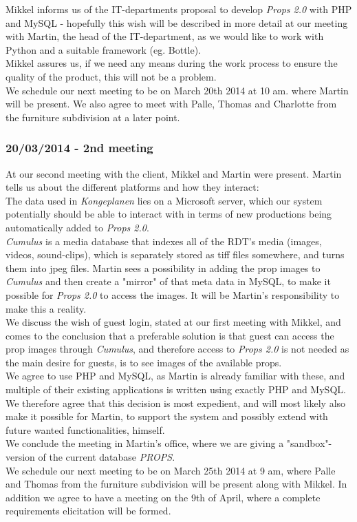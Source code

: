 \documentclass[12pt]{article}
\begin{document}
Mikkel informs us of the IT-departments proposal to develop \textit{Props 2.0} with PHP and MySQL - hopefully this wish will be described in more detail at our meeting with Martin, the head of the IT-department, as we would like to work with Python and a suitable framework (eg. Bottle). \\
Mikkel assures us, if we need any means during the work process to ensure the quality of the product, this will not be a problem.\\
We schedule our next meeting to be on March 20th 2014 at 10 am. where Martin will be present. We also agree to meet with Palle, Thomas and Charlotte from the furniture subdivision at a later point.
\subsubsection{20/03/2014 - 2nd meeting}
At our second meeting with the client, Mikkel and Martin were present. Martin tells us about the different platforms and how they interact:\\
The data used in \textit{Kongeplanen} lies on a Microsoft server, which our system potentially should be able to interact with in terms of new productions being automatically added to \textit{Props 2.0}. \\
\textit{Cumulus} is a media database that indexes all of the RDT's media (images, videos, sound-clips), which is separately  stored as tiff files somewhere, and turns them into jpeg files. Martin sees a possibility in adding the prop images to \textit{Cumulus} and then create a "mirror" of that meta data in MySQL, to make it possible for \textit{Props 2.0} to access the images. It will be Martin's responsibility to make this a reality. \\
We discuss the wish of guest login, stated at our first meeting with Mikkel, and comes to the conclusion that a preferable solution is that guest can access the prop images through \textit{Cumulus}, and therefore access to \textit{Props 2.0} is not needed as the main desire for guests, is to see images of the available props.\\
We agree to use PHP and MySQL, as Martin is already familiar with these, and multiple of their existing applications is written using exactly PHP and MySQL. We therefore agree that this decision is most expedient, and will most likely also make it possible for Martin, to support the system and possibly extend with future wanted functionalities, himself. \\
We conclude the meeting in Martin's office, where we are giving a "sandbox"-version of the current database \textit{PROPS}. \\
We schedule our next meeting to be on March 25th 2014 at 9 am, where Palle and Thomas from the furniture subdivision will be present along with Mikkel. In addition we agree to have a meeting on the 9th of April, where a complete requirements elicitation will be formed. 
\end{document}
